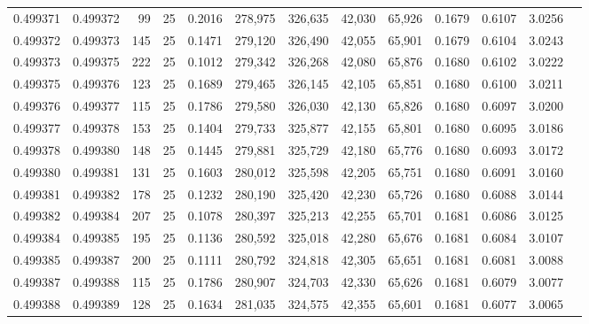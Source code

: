 \begin{tabular}{rrrrrrrrrrrrr}
0.499371 & 0.499372 &  99 &  25 &                                     0.2016 & 278,975 & 326,635 &  42,030 &  65,926 & 0.1679 & 0.6107 & 3.0256 \\
0.499372 & 0.499373 & 145 &  25 &                                     0.1471 & 279,120 & 326,490 &  42,055 &  65,901 & 0.1679 & 0.6104 & 3.0243 \\
0.499373 & 0.499375 & 222 &  25 &                                     0.1012 & 279,342 & 326,268 &  42,080 &  65,876 & 0.1680 & 0.6102 & 3.0222 \\
0.499375 & 0.499376 & 123 &  25 &                                     0.1689 & 279,465 & 326,145 &  42,105 &  65,851 & 0.1680 & 0.6100 & 3.0211 \\
0.499376 & 0.499377 & 115 &  25 &                                     0.1786 & 279,580 & 326,030 &  42,130 &  65,826 & 0.1680 & 0.6097 & 3.0200 \\
0.499377 & 0.499378 & 153 &  25 &                                     0.1404 & 279,733 & 325,877 &  42,155 &  65,801 & 0.1680 & 0.6095 & 3.0186 \\
0.499378 & 0.499380 & 148 &  25 &                                     0.1445 & 279,881 & 325,729 &  42,180 &  65,776 & 0.1680 & 0.6093 & 3.0172 \\
0.499380 & 0.499381 & 131 &  25 &                                     0.1603 & 280,012 & 325,598 &  42,205 &  65,751 & 0.1680 & 0.6091 & 3.0160 \\
0.499381 & 0.499382 & 178 &  25 &                                     0.1232 & 280,190 & 325,420 &  42,230 &  65,726 & 0.1680 & 0.6088 & 3.0144 \\
0.499382 & 0.499384 & 207 &  25 &                                     0.1078 & 280,397 & 325,213 &  42,255 &  65,701 & 0.1681 & 0.6086 & 3.0125 \\
0.499384 & 0.499385 & 195 &  25 &                                     0.1136 & 280,592 & 325,018 &  42,280 &  65,676 & 0.1681 & 0.6084 & 3.0107 \\
0.499385 & 0.499387 & 200 &  25 &                                     0.1111 & 280,792 & 324,818 &  42,305 &  65,651 & 0.1681 & 0.6081 & 3.0088 \\
0.499387 & 0.499388 & 115 &  25 &                                     0.1786 & 280,907 & 324,703 &  42,330 &  65,626 & 0.1681 & 0.6079 & 3.0077 \\
0.499388 & 0.499389 & 128 &  25 &                                     0.1634 & 281,035 & 324,575 &  42,355 &  65,601 & 0.1681 & 0.6077 & 3.0065 \\

\end{tabular}
